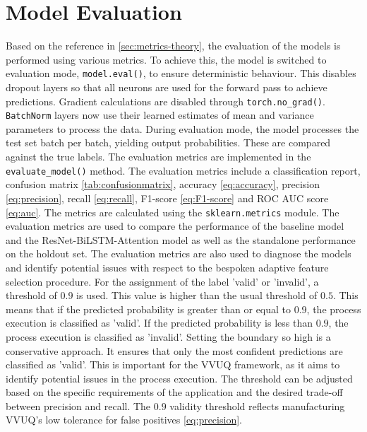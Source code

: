 \section{Model Evaluation}
Based on the reference in \autoref{sec:metrics-theory}, the evaluation of the models is performed using various metrics. To achieve this, the model is switched to evaluation mode, \texttt{model.eval()}, to ensure deterministic behaviour. This disables dropout layers so that all neurons are used for the forward pass to achieve predictions. Gradient calculations are disabled through \texttt{torch.no\_grad()}. \texttt{BatchNorm} layers now use their learned estimates of mean and variance parameters to process the data. During evaluation mode, the model processes the test set batch per batch, yielding output probabilities. These are compared against the true labels. The evaluation metrics are implemented in the \texttt{evaluate\_model()} method. The evaluation metrics include a classification report, confusion matrix \autoref{tab:confusionmatrix}, accuracy \autoref{eq:accuracy}, precision \autoref{eq:precision}, recall \autoref{eq:recall}, F1-score \autoref{eq:F1-score} and ROC AUC score \autoref{eq:auc}. The metrics are calculated using the \texttt{sklearn.metrics} module. The evaluation metrics are used to compare the performance of the baseline model and the ResNet-BiLSTM-Attention model as well as the standalone performance on the holdout set. The evaluation metrics are also used to diagnose the models and identify potential issues with respect to the bespoken adaptive feature selection procedure. For the assignment of the label 'valid' or 'invalid', a threshold of $0.9$ is used. This value is higher than the usual threshold of $0.5$. This means that if the predicted probability is greater than or equal to $0.9$, the process execution is classified as 'valid'. If the predicted probability is less than $0.9$, the process execution is classified as 'invalid'. Setting the boundary so high is a conservative approach. It ensures that only the most confident predictions are classified as 'valid'. This is important for the VVUQ framework, as it aims to identify potential issues in the process execution. The threshold can be adjusted based on the specific requirements of the application and the desired trade-off between precision and recall. The $0.9$ validity threshold reflects manufacturing VVUQ's low tolerance for false positives \autoref{eq:precision}.